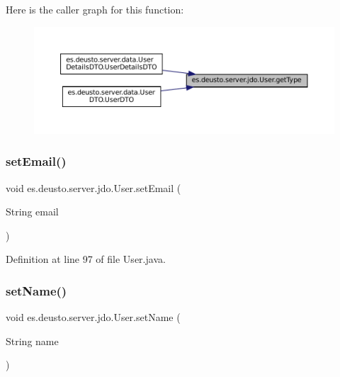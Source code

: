 Here is the caller graph for this function\+:
\nopagebreak
\begin{figure}[H]
\begin{center}
\leavevmode
\includegraphics[width=350pt]{classes_1_1deusto_1_1server_1_1jdo_1_1_user_ac7a47d7d9f3b6212ea22d2fe6b0e8457_icgraph}
\end{center}
\end{figure}
\mbox{\label{classes_1_1deusto_1_1server_1_1jdo_1_1_user_affc32b9cc71d8e45cb695339b34a2abd}} 
\subsubsection{\texorpdfstring{setEmail()}{setEmail()}}
{\footnotesize\ttfamily void es.\+deusto.\+server.\+jdo.\+User.\+set\+Email (\begin{DoxyParamCaption}\item[{String}]{email }\end{DoxyParamCaption})}



Definition at line 97 of file User.\+java.

\mbox{\label{classes_1_1deusto_1_1server_1_1jdo_1_1_user_a1684a5a2d021ec4c3137a46a4e76d0c7}} 
\subsubsection{\texorpdfstring{setName()}{setName()}}
{\footnotesize\ttfamily void es.\+deusto.\+server.\+jdo.\+User.\+set\+Name (\begin{DoxyParamCaption}\item[{String}]{name }\end{DoxyParamCaption})}



